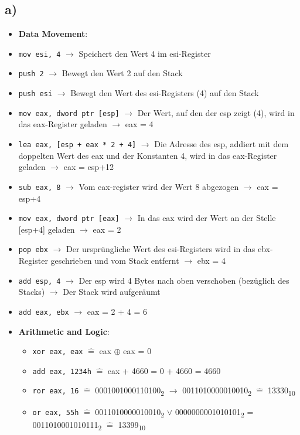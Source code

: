 \documentclass[]{scrreprt}
\begin{document}
\subsection*{a)}
\begin{itemize}
		\item \textbf{Data Movement}:
			\item \texttt{mov esi, 4} $\rightarrow$ Speichert den Wert 4 im esi-Register
			\item \texttt{push 2} $\rightarrow$ Bewegt den Wert 2 auf den Stack
			\item \texttt{push esi} $\rightarrow$ Bewegt den Wert des esi-Registers (4) auf den Stack
			\item \texttt{mov eax, dword ptr [esp]} $\rightarrow$ Der Wert, auf den der esp zeigt (4), wird in das eax-Register geladen $\rightarrow$ eax = 4
			\item \texttt{lea eax, [esp + eax * 2 + 4]} $\rightarrow$ Die Adresse des esp, addiert mit dem doppelten Wert des eax und der Konstanten 4, wird in das eax-Register geladen $\rightarrow$ eax = esp+12
			\item \texttt{sub eax, 8} $\rightarrow$ Vom eax-register wird der Wert 8 abgezogen $\rightarrow$ eax = esp+4
			\item \texttt{mov eax, dword ptr [eax]} $\rightarrow$ In das eax wird der Wert an der Stelle [esp+4] geladen $\rightarrow$ eax = 2
			\item \texttt{pop ebx} $\rightarrow$ Der ursprüngliche Wert des esi-Registers wird in das ebx-Register geschrieben und vom Stack entfernt $\rightarrow$ ebx = 4
			\item \texttt{add esp, 4} $\rightarrow$ Der esp wird 4 Bytes nach oben verschoben (bezüglich des Stacks) $\rightarrow$ Der Stack wird aufgeräumt
			\item \texttt{add eax, ebx} $\rightarrow$ eax = 2 + 4 = 6
		\item  \textbf{Arithmetic and Logic}:
		\begin{itemize}
			\item \texttt{xor eax, eax} $\hat{=}$ eax $\oplus$ eax = 0
			\item \texttt{add eax, 1234h} $\hat{=}$ eax + 4660 = 0 + 4660 = 4660
			\item \texttt{ror eax, 16} $\hat{=}$ {0001001000110100}\textsubscript{2} $\rightarrow$ {0011010000010010}\textsubscript{2} $\hat{=}$  {13330}\textsubscript{10}
			\item \texttt{or eax, 55h} $\hat{=}$ {0011010000010010}\textsubscript{2} $\vee$ {0000000001010101}\textsubscript{2} = {0011010001010111}\textsubscript{2} $\hat{=}$ {13399}\textsubscript{10}

\end{itemize}
\end{itemize}
\end{document}
